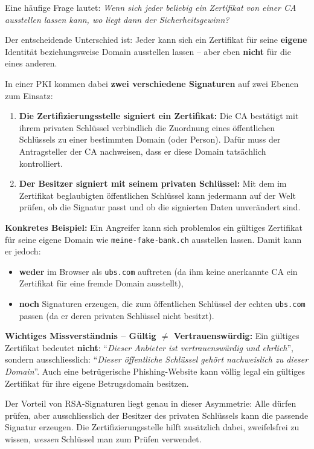 \begin{myremark}
	Eine häufige Frage lautet: \emph{Wenn sich jeder beliebig ein Zertifikat von einer \gls{CA} ausstellen lassen kann, wo liegt dann der Sicherheitsgewinn?}

	Der entscheidende Unterschied ist: Jeder kann sich ein Zertifikat für seine \textbf{eigene} Identität beziehungsweise Domain ausstellen lassen -- aber eben \textbf{nicht} für die eines anderen.

	In einer \gls{PKI} kommen dabei \textbf{zwei verschiedene Signaturen} auf zwei Ebenen zum Einsatz:
	\begin{enumerate}
		\item \textbf{Die Zertifizierungsstelle signiert ein Zertifikat:} Die \gls{CA} bestätigt mit ihrem privaten Schlüssel verbindlich die Zuordnung eines öffentlichen Schlüssels zu einer bestimmten Domain (oder Person). Dafür muss der Antragsteller der \gls{CA} nachweisen, dass er diese Domain tatsächlich kontrolliert.
		\item \textbf{Der Besitzer signiert mit seinem privaten Schlüssel:} Mit dem im Zertifikat beglaubigten öffentlichen Schlüssel kann jedermann auf der Welt prüfen, ob die Signatur passt und ob die signierten Daten unverändert sind.
	\end{enumerate}

	\smallskip\noindent\textbf{Konkretes Beispiel:}
	Ein Angreifer kann sich problemlos ein gültiges Zertifikat für seine eigene Domain wie \texttt{meine-fake-bank.ch} ausstellen lassen. Damit kann er jedoch:
	\begin{itemize}
		\item \textbf{weder} im Browser als \texttt{ubs.com} auftreten (da ihm keine anerkannte \gls{CA} ein Zertifikat für eine fremde Domain ausstellt),
		\item \textbf{noch} Signaturen erzeugen, die zum öffentlichen Schlüssel der echten \texttt{ubs.com} passen (da er deren privaten Schlüssel nicht besitzt).
	\end{itemize}

	\smallskip\noindent\textbf{Wichtiges Missverständnis -- Gültig $\neq$ Vertrauenswürdig:}
	Ein gültiges Zertifikat bedeutet \textbf{nicht}: \enquote{\emph{Dieser Anbieter ist vertrauenswürdig und ehrlich}}, sondern ausschliesslich: \enquote{\emph{Dieser öffentliche Schlüssel gehört nachweislich zu dieser Domain}}. Auch eine betrügerische Phishing-Website kann völlig legal ein gültiges Zertifikat für ihre eigene Betrugsdomain besitzen.

	Der Vorteil von \gls{RSA}-Signaturen liegt genau in dieser Asymmetrie: Alle dürfen prüfen, aber ausschliesslich der Besitzer des privaten Schlüssels kann die passende Signatur erzeugen. Die Zertifizierungsstelle hilft zusätzlich dabei, zweifelsfrei zu wissen, \emph{wessen} Schlüssel man zum Prüfen verwendet.
\end{myremark}

